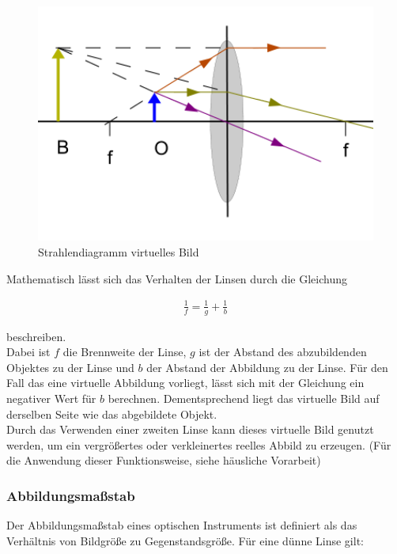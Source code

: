\documentclass[a4paper]{scrartcl}
\numberwithin{equation}{subsection}
\begin{document}
\begin{figure}[H]
\includegraphics[width=12cm]{Abbildungen/strahlendiagramm2}
\centering
\caption{Strahlendiagramm virtuelles Bild\cite{anl}}
\centering
\label{fig:strahlendiagramm2}
\end{figure}

Mathematisch lässt sich das Verhalten der Linsen durch die Gleichung

\begin{align}
\frac{1}{f} = \frac{1}{g} + \frac{1}{b}
\end{align}

beschreiben.\cite{anl} \\
Dabei ist $f$ die Brennweite der Linse, $g$ ist der Abstand des abzubildenden Objektes zu der Linse und $b$ der Abstand der Abbildung zu der Linse.
Für den Fall das eine virtuelle Abbildung vorliegt, lässt sich mit der Gleichung ein negativer Wert für $b$ berechnen. Dementsprechend liegt das virtuelle Bild auf derselben Seite wie das abgebildete Objekt.\\

Durch das Verwenden einer zweiten Linse kann dieses virtuelle Bild genutzt werden, um ein vergrößertes oder verkleinertes reelles Abbild zu erzeugen. (Für die Anwendung dieser Funktionsweise, siehe häusliche Vorarbeit)

\subsubsection{Abbildungsmaßstab}

Der Abbildungsmaßstab eines optischen Instruments ist definiert als das Verhältnis von Bildgröße zu Gegenstandsgröße. Für eine dünne Linse gilt: \cite{anl}
\end{document}
